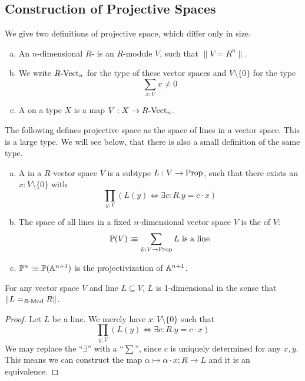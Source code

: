 
\subsection{Construction of Projective Spaces}
We give two definitions of projective space, which differ only in size.

\begin{definition}%
  \begin{enumerate}[(a)]
  \item An $n$-dimensional $R$- is an $R$-module $V$,
    such that $\| V = R^n \|$. 
  \item We write $R\text{-}\mathrm{Vect}_{n}$ for the type of these vector spaces and $V\setminus\{0\}$ for the type
    \[ \sum_{x:V}x\neq 0\]
  \item A  on a type $X$ is a map $V:X\to R\text{-}\mathrm{Vect}_{n}$. 
  \end{enumerate}
\end{definition}

The following defines projective space as the space of lines in a vector space.
This is a large type.
We will see below, that there is also a small definition of the same type.

\begin{definition}%
  \begin{enumerate}[(a)]
  \item   A  in a $R$-vector space $V$ is a subtype $L:V\to \mathrm{Prop}$,
    such that there exists an $x:V\setminus\{0\}$ with
    \[ \prod_{y:V}\left(L (y) \Leftrightarrow \exists c:R.y=c\cdot x\right)\]
  \item The space of all lines in a fixed $n$-dimensional vector space $V$ is the  of $V$:
    \[ \mathbb{P}(V)\vcentcolon\mspace{-1.2mu}\equiv \sum_{L:V\to \mathrm{Prop}} L \text{ is a line}  \]
  \item {} $\mathbb{P}^n \vcentcolon\mspace{-1.2mu}\equiv \mathbb{P}(\mathbb{A}^{n+1})$ is the projectivization of $\mathbb{A}^{n+1}$.
  \end{enumerate}
\end{definition}

\begin{proposition}%
  \label{lines-are-one-dimensional}
  For any vector space $V$ and line $L\subseteq V$,
  $L$ is 1-dimensional in the sense that $\|L=_{R\text{-}\mathrm{Mod}}R\|$.
\end{proposition}

\begin{proof}
  Let $L$ be a line.
  We merely have $x:V\setminus\{0\}$ such that 
  \[ \prod_{y:V}\left(L (y) \Leftrightarrow \exists c:R.y=c\cdot x\right)\]
  We may replace the ``$\exists$'' with a ``$\sum$'',
  since $c$ is uniquely determined for any $x,y$.
  This means we can construct the map $\alpha\mapsto \alpha\cdot x:R\to L$ and it is an equivalence.
\end{proof}

